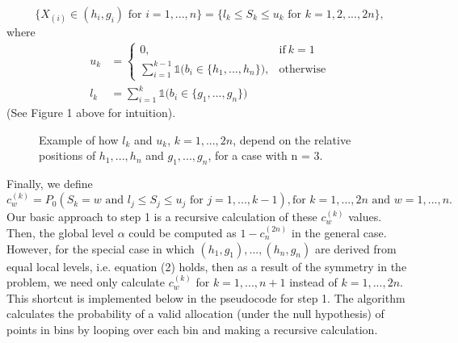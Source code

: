 \documentclass[article]{jss}
\begin{document}
%
\begin{equation*}
    \{X_{(i)} \in (h_{i}, g_{i}) \text{ for } i = 1, ..., n\} = \{l_{k} \leq S_{k} \leq u_{k} \textrm{ for } k = 1, 2, ..., 2n\},
\end{equation*}
%
where
%
\begin{align*}
u_{k} &=
    \begin{cases}
      0, & \text{if}\ k=1 \\
      \sum_{i = 1}^{k - 1} \mathds{1} \big(b_{i} \in \{h_{1}, ..., h_{n}\}\big), & \text{otherwise}
    \end{cases}\\
    l_{k} &=
      \sum_{i = 1}^{k} \mathds{1} \big(b_{i} \in \{g_{1}, ..., g_{n}\}\big)
\end{align*}
%
(See Figure 1 above for intuition).
\begin{figure}
\centering
{}
\caption{Example of how $l_{k}$ and $u_{k}$, $k = 1, ..., 2n$, depend on the relative positions of $h_{1}, ..., h_{n}$ and $g_{1}, ..., g_{n}$, for a case with n = 3. }
\end{figure}
Finally, we define
%
\begin{equation*}
    c_{w}^{(k)} = P_{0}(S_{k} = w \textrm{ and } l_{j} \leq S_{j} \leq u_{j} \textrm{ for } j = 1, ..., k - 1), \textrm{for } k = 1, ..., 2n \textrm{ and } w = 1, ..., n.
\end{equation*}
%
Our basic approach to step 1 is a recursive calculation of these $c_{w}^{(k)}$ values. Then, the global level $\alpha$ could be computed as $1 - c_{n}^{(2n)}$ in the general case. However, for the special case in which $(h_{1}, g_{1}), ..., (h_{n}, g_{n})$ are derived from equal local levels, i.e. equation (2) holds, then as a result of the symmetry in the problem, we need only calculate $c_{w}^{(k)}$ for $k = 1, ..., n+1$ instead of $k = 1, ... , 2n$. This shortcut is implemented below in the pseudocode for step 1. The algorithm calculates the probability of a valid allocation (under the null hypothesis) of points in bins by looping over each bin and making a recursive calculation.
\end{document}
